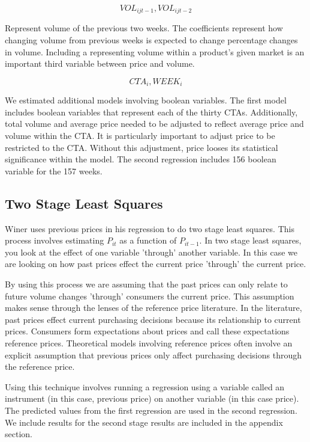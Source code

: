 \documentclass{article}
\begin{document}
$${VOL}_{ijt-1}, {VOL}_{ijt-2} $$

Represent volume of the previous two weeks. The coefficients represent how changing volume from previous weeks is expected to change percentage changes in volume. Including a representing volume within a product's given market is an important third variable between price and volume.

$$ CTA_i, WEEK_{i}$$

We estimated additional models involving boolean variables. The first model includes boolean variables that represent each of the thirty CTAs. Additionally, total volume and average price needed to be adjusted to reflect average price and volume within the CTA. It is particularly important to adjust price to be restricted to the CTA. Without this adjustment, price looses its statistical significance within the model. The second regression includes 156 boolean variable for the 157 weeks.

\subsection{Two Stage Least Squares}

Winer uses previous prices in his regression to do two stage least squares. This process involves estimating ${P}_{it}$ as a function of ${P}_{it-1}$. In two stage least squares, you look at the effect of one variable 'through' another variable.  In this case we are looking on how past prices effect the current price 'through' the current price. 

By using this process we are assuming that the past prices can only relate to future volume changes 'through' consumers the current price. This assumption makes sense through the lenses of the reference price literature. In the literature, past prices effect current purchasing decisions because its relationship to current prices. Consumers form expectations about prices and call these expectations reference prices. Theoretical models involving reference prices often involve an explicit assumption that previous prices only affect purchasing decisions through the reference price.

Using this technique involves running a regression using a variable called an instrument (in this case, previous price) on another variable (in this case price). The predicted values from the first regression are used in the second regression. We include results for the second stage results are included in the appendix section.\\
\end{document}
